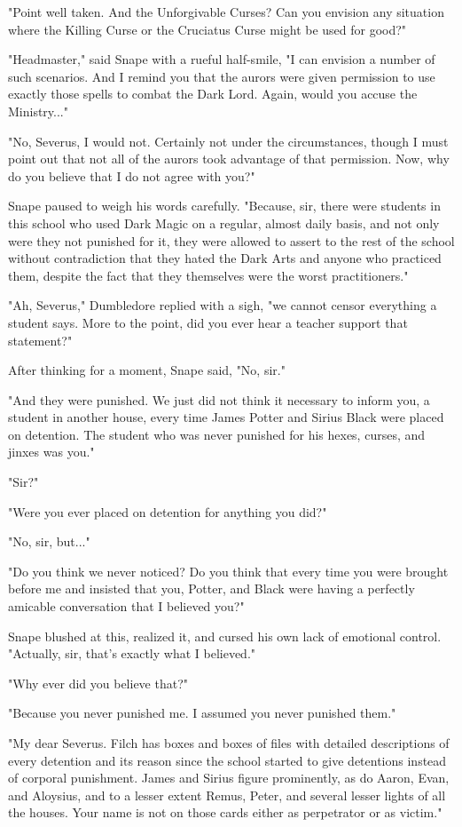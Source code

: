 \documentclass[a4paper,11pt]{article}
\begin{document}
"Point well taken. And the Unforgivable Curses? Can you envision any situation where the Killing Curse or the Cruciatus Curse might be used for good?"

"Headmaster," said Snape with a rueful half-smile, "I can envision a number of such scenarios. And I remind you that the aurors were given permission to use exactly those spells to combat the Dark Lord. Again, would you accuse the Ministry..."

"No, Severus, I would not. Certainly not under the circumstances, though I must point out that not all of the aurors took advantage of that permission. Now, why do you believe that I do not agree with you?"

Snape paused to weigh his words carefully. "Because, sir, there were students in this school who used Dark Magic on a regular, almost daily basis, and not only were they not punished for it, they were allowed to assert to the rest of the school without contradiction that they hated the Dark Arts and anyone who practiced them, despite the fact that they themselves were the worst practitioners."

"Ah, Severus," Dumbledore replied with a sigh, "we cannot censor everything a student says. More to the point, did you ever hear a teacher support that statement?"

After thinking for a moment, Snape said, "No, sir."

"And they were punished. We just did not think it necessary to inform you, a student in another house, every time James Potter and Sirius Black were placed on detention. The student who was never punished for his hexes, curses, and jinxes was you."

"Sir?"

"Were you ever placed on detention for anything you did?"

"No, sir, but..."

"Do you think we never noticed? Do you think that every time you were brought before me and insisted that you, Potter, and Black were having a perfectly amicable conversation that I believed you?"

Snape blushed at this, realized it, and cursed his own lack of emotional control. "Actually, sir, that's exactly what I believed."

"Why ever did you believe that?"

"Because you never punished me. I assumed you never punished them."

"My dear Severus. Filch has boxes and boxes of files with detailed descriptions of every detention and its reason since the school started to give detentions instead of corporal punishment. James and Sirius figure prominently, as do Aaron, Evan, and Aloysius, and to a lesser extent Remus, Peter, and several lesser lights of all the houses. Your name is not on those cards either as perpetrator or as victim."
\end{document}
